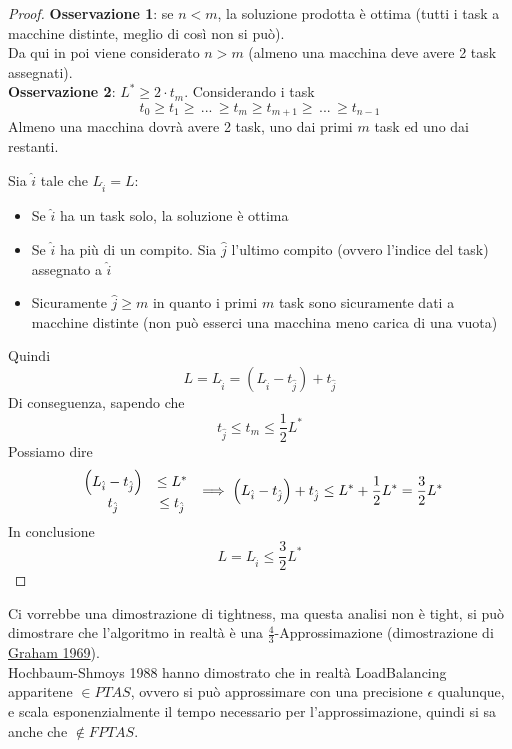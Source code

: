 \begin{proof}
	\textbf{Osservazione 1}: se $n<m$, la soluzione prodotta è ottima (tutti i task a macchine distinte, meglio di così non si può).\\
	
	Da qui in poi viene considerato $n>m$ (almeno una macchina deve avere 2 task assegnati).\\
	
	\textbf{Osservazione 2}: $L^\ast \geq 2 \cdot t_m$. Considerando i task
	$$ t_0 \geq t_1 \geq \, ... \, \geq t_m \geq t_{m+1} \geq \, ... \, \geq t_{n-1} $$
	Almeno una macchina dovrà avere 2 task, uno dai primi $m$ task ed uno dai restanti.\\
	
	\newpage
	
	Sia $\hat{i}$ tale che $L_{\hat{i}} = L$:
	\begin{itemize}
		\item Se $\hat{i}$ ha un task solo, la soluzione è ottima
		\item Se $\hat{i}$ ha più di un compito. Sia $\hat{j}$ l'ultimo compito (ovvero l'indice del task) assegnato a $\hat{i}$
		\item Sicuramente $\hat{j} \geq m$ in quanto i primi $m$ task sono sicuramente dati a macchine distinte (non può esserci una macchina meno carica di una vuota)
	\end{itemize}
	Quindi 
	$$ L = L_{\hat{i}} = \left(L_{\hat{i}} - t_{\hat{j}}\right) + t_{\hat{j}} $$  
	Di conseguenza, sapendo che
	$$ t_{\hat{j}} \leq t_m \leq \frac{1}{2} L^\ast $$
	Possiamo dire
	$$
	\begin{array}{c c}
		\left(L_{\hat{i}} - t_{\hat{j}}\right)  & \leq L^\ast \\
		t_{\hat{j}} & \leq t_{\hat{j}}
	\end{array}
	\implies
	\left(L_{\hat{i}} - t_{\hat{j}}\right) + t_{\hat{j}}  \leq L^\ast + \frac{1}{2} L^\ast = \frac{3}{2} L^\ast
	$$
	In conclusione
	$$ L = L_{\hat{i}} \leq \frac{3}{2}L^\ast $$
	
\end{proof}

Ci vorrebbe una dimostrazione di tightness, ma questa analisi non è tight, si può dimostrare che l'algoritmo in realtà è una $\frac{4}{3}$-Approssimazione (dimostrazione di \href{https://www.jstor.org/stable/pdf/2099572.pdf}{Graham 1969}).\\

Hochbaum-Shmoys 1988 hanno dimostrato che in realtà LoadBalancing apparitene $\in PTAS$, ovvero si può approssimare con una precisione $\epsilon$ qualunque, e scala esponenzialmente il tempo necessario per l'approssimazione, quindi si sa anche che $\notin FPTAS$.\\

